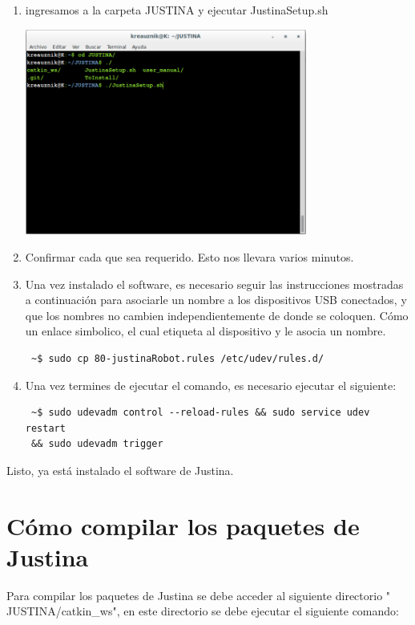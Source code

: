 \documentclass[user_manual.tex]{subfiles}
\begin{document}
\begin{enumerate}
 \item ingresamos a la carpeta JUSTINA y ejecutar JustinaSetup.sh
  \begin{center}
\includegraphics[width=0.73\textwidth]{Figures/PP/pp4.png}
\end{center}
 \item Confirmar cada que sea requerido. Esto nos llevara varios minutos.
 \item Una vez instalado el software, es necesario seguir las instrucciones mostradas a continuación para asociarle un nombre a los dispositivos USB conectados, y que los nombres no cambien independientemente de donde se coloquen. Cómo un enlace simbolico, el cual etiqueta al dispositivo y le asocia un nombre.

\begin{verbatim}
 ~$ sudo cp 80-justinaRobot.rules /etc/udev/rules.d/
\end{verbatim}
 
 \item Una vez termines de ejecutar el comando, es necesario ejecutar el siguiente: 
 
\begin{verbatim}
 ~$ sudo udevadm control --reload-rules && sudo service udev restart 
 && sudo udevadm trigger
\end{verbatim}

 
\end{enumerate}
Listo, ya está instalado el software de Justina.

\section{Cómo compilar los paquetes de Justina}
Para compilar los paquetes de Justina se debe acceder al siguiente directorio " JUSTINA/catkin\_ws", en este directorio se debe ejecutar el siguiente comando: 
\end{document}
